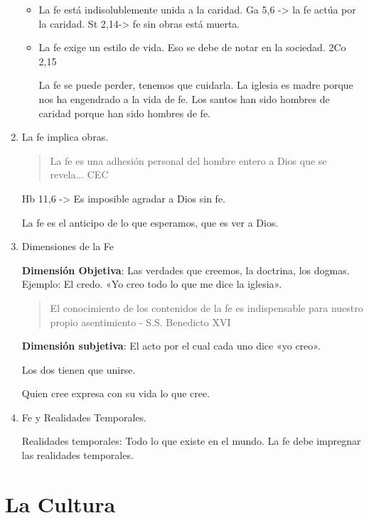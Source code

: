 \documentclass[a4paper,12pt,oneside]{article}
\begin{document}
\begin{enumerate}
\begin{itemize}
        \item La fe está indisolublemente unida a la caridad. Ga 5,6 -> la fe actúa por la caridad. St 2,14-> fe sin obras está muerta.

        \item La fe exige un estilo de vida. Eso se debe de notar en la sociedad. 2Co 2,15

        La fe se puede perder, tenemos que cuidarla. La iglesia es madre porque nos ha engendrado a la vida de fe. Los santos han sido hombres de caridad porque han sido hombres de fe.
    \end{itemize}

    \item La fe implica obras.

    \begin{quote}
    La fe es una adhesión personal del hombre entero a Dios que se revela... CEC
    \end{quote}

    Hb 11,6 -> Es imposible agradar a Dios sin fe.

    La fe es el anticipo de lo que esperamos, que es ver a Dios.

    \item Dimensiones de la Fe

    \textbf{Dimensión Objetiva}: Las verdades que creemos, la doctrina, los dogmas. Ejemplo: El credo. «Yo creo todo lo que me dice la iglesia».

    \begin{quote}
    El conocimiento de los contenidos de la fe es indispensable para nuestro propio asentimiento - S.S. Benedicto XVI
    \end{quote}

    \textbf{Dimensión subjetiva}: El acto por el cual cada uno dice «yo creo».

    Los dos tienen que unirse.

    Quien cree expresa con su vida lo que cree.

    \item Fe y Realidades Temporales.

    Realidades temporales: Todo lo que existe en el mundo. La fe debe impregnar las realidades temporales.
\end{enumerate}

\section*{La Cultura}
\end{document}
